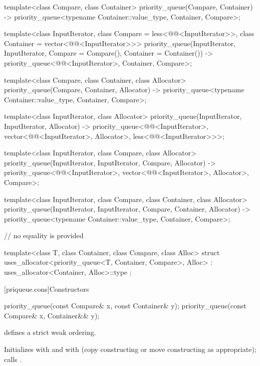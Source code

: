 \begin{codeblock}
{  template<class Compare, class Container>
    priority_queue(Compare, Container)
      -> priority_queue<typename Container::value_type, Container, Compare>;

  template<class InputIterator,
           class Compare = less<@@<InputIterator>>,
           class Container = vector<@@<InputIterator>>>
    priority_queue(InputIterator, InputIterator, Compare = Compare(), Container = Container())
      -> priority_queue<@@<InputIterator>, Container, Compare>;

  template<class Compare, class Container, class Allocator>
    priority_queue(Compare, Container, Allocator)
      -> priority_queue<typename Container::value_type, Container, Compare>;

  template<class InputIterator, class Allocator>
    priority_queue(InputIterator, InputIterator, Allocator)
      -> priority_queue<@@<InputIterator>,
                        vector<@@<InputIterator>, Allocator>,
                        less<@@<InputIterator>>>;

  template<class InputIterator, class Compare, class Allocator>
    priority_queue(InputIterator, InputIterator, Compare, Allocator)
      -> priority_queue<@@<InputIterator>,
                        vector<@@<InputIterator>, Allocator>, Compare>;

  template<class InputIterator, class Compare, class Container, class Allocator>
    priority_queue(InputIterator, InputIterator, Compare, Container, Allocator)
      -> priority_queue<typename Container::value_type, Container, Compare>;

  // no equality is provided

  template<class T, class Container, class Compare, class Alloc>
    struct uses_allocator<priority_queue<T, Container, Compare>, Alloc>
      : uses_allocator<Container, Alloc>::type { };
}
\end{codeblock}

[priqueue.cons]{Constructors}

%
\begin{itemdecl}
priority_queue(const Compare& x, const Container& y);
priority_queue(const Compare& x, Container&& y);
\end{itemdecl}

\begin{itemdescr}
\pnum
\expects
{} defines a strict weak ordering.

\pnum
\effects
Initializes
 with
 and
 with
 (copy constructing or move constructing as appropriate);
calls
.
\end{itemdescr}

